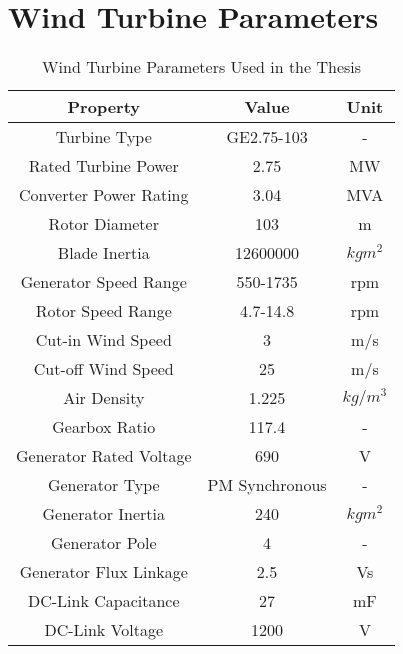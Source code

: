 \chapter{Wind Turbine Parameters}
\label{chp:appendixA}

\begin{table}[h]

		\centering
		\begin{tabular}{ccc}
			\hline
			\textbf{Property}       & \textbf{Value} & \textbf{Unit} \\ \hline
			Turbine Type            & GE2.75-103     & -             \\
			Rated Turbine Power     & 2.75           & MW            \\
			Converter Power Rating  & 3.04           & MVA           \\
			Rotor Diameter          & 103            & m             \\
			Blade Inertia           & 12600000       & $kgm^{2}$     \\
			Generator Speed Range   & 550-1735       & rpm           \\
			Rotor Speed Range       & 4.7-14.8       & rpm           \\
			Cut-in Wind Speed       & 3              & m/s           \\
			Cut-off Wind Speed      & 25             & m/s           \\
			Air Density             & 1.225          & $kg/m^{3}$    \\
			Gearbox Ratio           & 117.4          & -             \\
			Generator Rated Voltage & 690            & V             \\
			Generator Type          & PM Synchronous & -             \\
			Generator Inertia       & 240            & $kgm^{2}$     \\
			Generator Pole          & 4              & -             \\
			Generator Flux Linkage  & 2.5            & Vs            \\
			DC-Link Capacitance     & 27             & mF            \\
			DC-Link Voltage         & 1200           & V             \\ \hline
		\end{tabular}

	\caption{Wind Turbine Parameters Used in the Thesis}
\end{table}